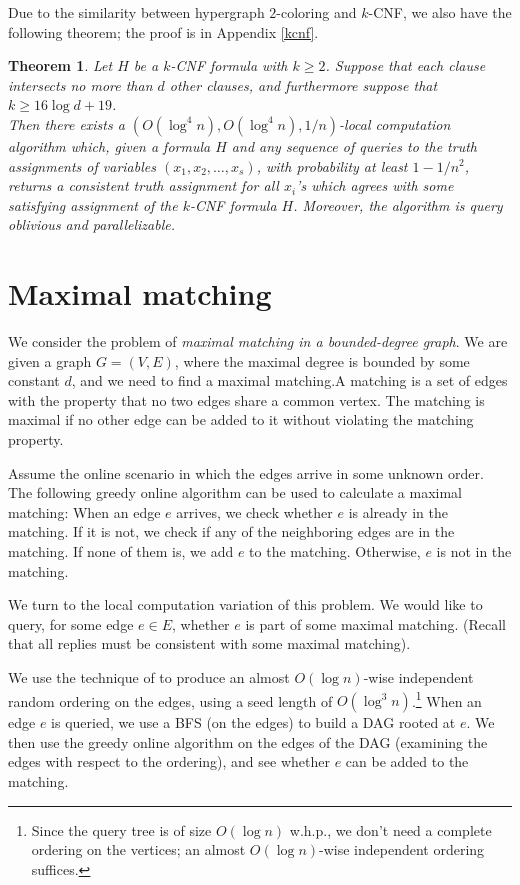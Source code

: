 \documentclass[english, oribibl]{llncs}
\newtheorem{theorem}{Theorem}[section]
\begin{document}
Due to the similarity between hypergraph $2$-coloring and $k$-CNF, we also have the following theorem; the proof is in Appendix \ref{kcnf}.
\begin{theorem}
Let $H$ be a $k$-CNF formula with $k\geq 2$. 
Suppose that each clause intersects no more than $d$ other clauses,
and furthermore suppose that $k \geq 16 \log{d} + 19$.\\
Then there exists a $(O(\log^4{n}), O(\log^4{n}), 1/n)$-local computation algorithm which, given a formula $H$ and any sequence of
queries to the truth assignments of variables $(x_1, x_2, \ldots, x_s)$, 
with probability at least $1-1/n^2$,
returns a consistent truth assignment for all $x_i$'s which agrees with some 
satisfying assignment of the $k$-CNF formula $H$. 
Moreover, the algorithm is query oblivious and parallelizable. 
\end{theorem}

\section{Maximal matching}
\label{section:matching}

We consider the problem of \emph{maximal matching in a bounded-degree graph}. We are given a graph $G=(V,E)$, where the maximal degree is bounded by some constant $d$, and we need to find a maximal matching.A matching is a set of edges with the property that no two edges share a common vertex. The matching is maximal if no other edge can be added to it without violating the matching property. 


 Assume the online scenario in which  the edges arrive in some unknown order. The following greedy online algorithm can be used to calculate a maximal matching: When an edge $e$ arrives, we check whether $e$ is already in the matching. If it is not, we check if any of the neighboring edges are in the matching. If none of them is, we add $e$ to the matching. Otherwise, $e$ is not in the matching.

We turn to the local computation variation of this problem.  We would like to query, for  some edge $e \in E$, whether $e$ is part of some maximal matching. (Recall that all replies must be consistent with some maximal matching).



We use the technique of \cite{ARV+11} to produce an almost $O(\log{n})$-wise independent random ordering on the edges, using a seed length of $O(\log^3{n})$.\footnote{Since the query tree is of size $O(\log{n})$ w.h.p., we don't need a complete ordering on the vertices; an almost $O(\log{n})$-wise independent ordering suffices.} When an edge $e$ is queried, we use a BFS (on the edges) to build a DAG rooted at $e$. We then use the greedy online algorithm on the edges of the DAG (examining the edges with respect to the ordering),  and see whether $e$ can be added to the matching. 
\end{document}
